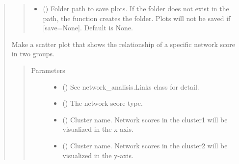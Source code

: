 \documentclass[letterpaper,10pt,english]{sphinxmanual}
\begin{document}
\begin{quote}
\begin{fulllineitems}
\begin{fulllineitems}
\begin{quote}
\begin{description}
\begin{itemize}
\item {} 
 () \textendash{} Folder path to save plots. If the folder does not exist in the path, the function creates the folder.
Plots will not be saved if {[}save=None{]}. Default is None.

\end{itemize}

\end{description}\end{quote}

\end{fulllineitems}


\begin{fulllineitems}
\label{\detokenize{modules/celloracle.network_analysis:celloracle.network_analysis.Links.plot_score_comparison_2D}}
Make a scatter plot that shows the relationship of a specific network score in two groups.
\begin{quote}\begin{description}
\item[{Parameters}] \leavevmode\begin{itemize}
\item {} 
 ({\hyperref[\detokenize{modules/celloracle:celloracle.Links}]{}}) \textendash{} See network\_analisis.Links class for detail.

\item {} 
 () \textendash{} The network score type.

\item {} 
 () \textendash{} Cluster name. Network scores in the cluster1 will be visualized in the x-axis.

\item {} 
 () \textendash{} Cluster name. Network scores in the cluster2 will be visualized in the y-axis.


\end{itemize}
\end{description}
\end{quote}
\end{fulllineitems}
\end{fulllineitems}
\end{quote}
\end{document}

